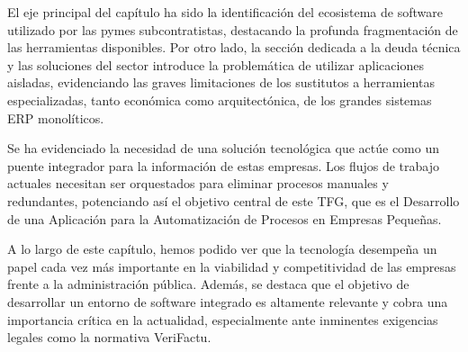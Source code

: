 El eje principal del capítulo ha sido la identificación del ecosistema de software utilizado por las pymes subcontratistas, destacando la profunda fragmentación de las herramientas disponibles. Por otro lado, la sección dedicada a la deuda técnica y las soluciones del sector introduce la problemática de utilizar aplicaciones aisladas, evidenciando las graves limitaciones de los sustitutos a herramientas especializadas, tanto económica como arquitectónica, de los grandes sistemas ERP monolíticos.

Se ha evidenciado la necesidad de una solución tecnológica que actúe como un puente integrador para la información de estas empresas. Los flujos de trabajo actuales necesitan ser orquestados para eliminar procesos manuales y redundantes, potenciando así el objetivo central de este TFG, que es el Desarrollo de una Aplicación para la Automatización de Procesos en Empresas Pequeñas.

A lo largo de este capítulo, hemos podido ver que la tecnología desempeña un papel cada vez más importante en la viabilidad y competitividad de las empresas frente a la administración pública. Además, se destaca que el objetivo de desarrollar un entorno de software integrado es altamente relevante y cobra una importancia crítica en la actualidad, especialmente ante inminentes exigencias legales como la normativa VeriFactu.